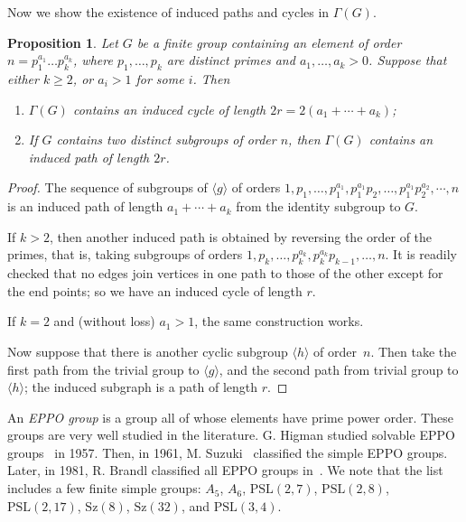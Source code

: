 \documentclass[11pt,twoside]{amsart}
\def \Ga {{\Gamma }}
\newtheorem{pro}[theorem]{Proposition}
\begin{document}
Now we show the existence of induced paths and cycles in $\Ga(G)$.

\begin{pro}
Let $G$ be a finite group containing an element of order
$n=p_1^{a_1}\dots p_k^{a_k}$, where $p_1,\ldots,p_k$ are distinct primes
and $a_1,\ldots,a_k>0$. Suppose that either $k\ge2$, or $a_i>1$ for some $i$.
Then
\begin{enumerate}
\item $\Ga(G)$ contains an induced cycle of length
$2r=2(a_1+\cdots+a_k)$;
\item If $G$ contains two distinct subgroups of order $n$, then $\Ga(G)$
contains an induced path of length $2r$.
\end{enumerate}
\end{pro}

\begin{proof}
The sequence of subgroups of $\langle g\rangle$ of orders
$1,p_1,\ldots,p_1^{a_1},p_1^{a_1}p_2,\ldots,p_1^{a_1}p_2^{a_2},\cdots,n$
is an induced path of length $a_1+\cdots+a_k$ from the identity subgroup
to $G$.

If $k>2$, then another induced path is obtained by reversing the order of
the primes, that is, taking subgroups of orders
$1,p_k,\ldots,p_k^{a_k},p_k^{a_k}p_{k-1},\ldots,n$. It is readily checked
that no edges join vertices in one path to those of the other except for
the end points; so we have an induced cycle of length $r$.

If $k=2$ and (without loss) $a_1>1$, the same construction works.

Now suppose that there is another cyclic subgroup $\langle h\rangle$ of
order~$n$. Then take the first path from the trivial group to
$\langle g\rangle$, and the second path from trivial group to 
$\langle h\rangle$; the induced subgraph is a path of length $r$.
\end{proof}

An {\em EPPO group} is a group all of whose elements have prime power order. These groups are very well studied in the literature. G. Higman studied solvable EPPO groups~\cite{Higman1957EPPO} in 1957. Then, in 1961, M. Suzuki~\cite{Suzuki1961NilpotentCentralizers}
classified the simple EPPO groups. Later, in 1981, R. Brandl classified all EPPO groups in~\cite{Brandl1981PrimePowerOrder}. We note that the list includes a few finite simple groups: $A_5$, $A_6$, $\mathrm{PSL}(2,7)$, $\mathrm{PSL}(2,8)$,
$\mathrm{PSL}(2,17)$, $\mathrm{Sz}(8)$, $\mathrm{Sz}(32)$, and 
$\mathrm{PSL}(3,4)$.
\end{document}

